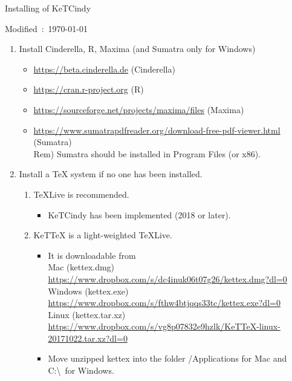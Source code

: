 \documentclass{article}
\begin{document}
\begin{center}
Installing of KeTCindy 
\end{center}

\hfill Modified\ :\ \today

\begin{enumerate}[\bf\large 1.]
\item Install Cinderella, R, Maxima (and Sumatra only for Windows)
 \begin{itemize}
 \item \url{https://beta.cinderella.de}  (Cinderella)
 \item \url{https://cran.r-project.org}   (R)
 \item \url{https://sourceforge.net/projects/maxima/files}  (Maxima)
 \item \url{https://www.sumatrapdfreader.org/download-free-pdf-viewer.html} (Sumatra)\\
\hspace*{5mm}Rem) Sumatra should be installed in Program Files (or x86).
 \end{itemize}
\item Install a TeX system if no one has been installed.
 \begin{enumerate}[(1)]
 \item TeXLive is recommended.
    \begin{itemize}
    \item KeTCindy has been implemented (2018 or later).
    \end{itemize}
 \item KeTTeX is a light-weighted TeXLive.
    \begin{itemize}
    \item It is downloadable from\\
    \hspace*{5mm}Mac (kettex.dmg)\\
    \hspace*{10mm}\url{https://www.dropbox.com/s/dc4inuk06t07g26/kettex.dmg?dl=0}\\
    \hspace*{5mm}Windows (kettex.exe)\\
    \hspace*{10mm}\url{https://www.dropbox.com/s/fthw4btjqqs33tc/kettex.exe?dl=0}\\
    \hspace*{5mm}Linux (kettex.tar.xz)\\
    \hspace*{10mm}\url{https://www.dropbox.com/s/vg8p07832e9hzlk/KeTTeX-linux-20171022.tar.xz?dl=0}
     \item Move unzipped kettex into the folder /Applications for Mac and C:\textbackslash\ for Windows.
    \end{itemize}
 \end{enumerate}


\end{enumerate}
\end{document}

